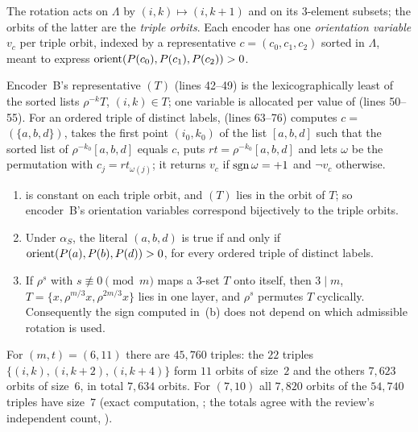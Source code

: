 \begin{definition}\label{k8s:def:orbits}
The rotation acts on $\Lambda$ by $(i,k)\mapsto(i,k+1)$ and on its $3$-element subsets; the orbits of the latter are the
\emph{triple orbits}. Each encoder has one \emph{orientation variable} $v_c$ per triple orbit, indexed by a
representative $c=(c_0,c_1,c_2)$ sorted in $\Lambda$, meant to express $\operatorname{orient}(P(c_0),P(c_1),P(c_2))>0$.
\end{definition}

Encoder~B's representative $(T)$ (lines 42--49) is the lexicographically least of the
sorted lists $\rho^{-k}T$, $(i,k)\in T$; one variable is allocated per value of  (lines 50--55). For an ordered
triple of distinct labels,  (lines 63--76) computes $c=$$(\{a,b,d\})$, takes the first point
$(i_0,k_0)$ of the list $[a,b,d]$ such that the sorted list of $\rho^{-k_0}[a,b,d]$ equals $c$, puts
$\mathit{rt}=\rho^{-k_0}[a,b,d]$ and lets $\omega$ be the permutation with $c_j=\mathit{rt}_{\omega(j)}$; it returns $v_c$ if
$\operatorname{sgn}\omega=+1$ and $\neg v_c$ otherwise.

\begin{lemma}\label{k8s:lem:orbit}
\begin{enumerate}[label=(\alph*)]
\item {} is constant on each triple orbit, and $(T)$ lies in the orbit of $T$; so encoder~B's
orientation variables correspond bijectively to the triple orbits.
\item Under $\alpha_S$, the literal $(a,b,d)$ is true if and only if $\operatorname{orient}(P(a),P(b),P(d))>0$, for every
ordered triple of distinct labels.
\item If $\rho^s$ with $s\not\equiv0\pmod m$ maps a $3$-set $T$ onto itself, then $3\mid m$, $T=\{x,\rho^{m/3}x,\rho^{2m/3}x\}$
lies in one layer, and $\rho^s$ permutes $T$ cyclically. Consequently the sign computed in~(b) does not depend on which
admissible rotation is used.
\end{enumerate}
For $(m,t)=(6,11)$ there are $45{,}760$ triples: the $22$ triples $\{(i,k),(i,k+2),(i,k+4)\}$ form $11$ orbits of
size~$2$ and the others $7{,}623$ orbits of size~$6$, in total $7{,}634$ orbits. For $(7,10)$ all $7{,}820$ orbits of
the $54{,}740$ triples have size~$7$ (exact computation, ; the totals agree with the review's
independent count, ).
\end{lemma}

